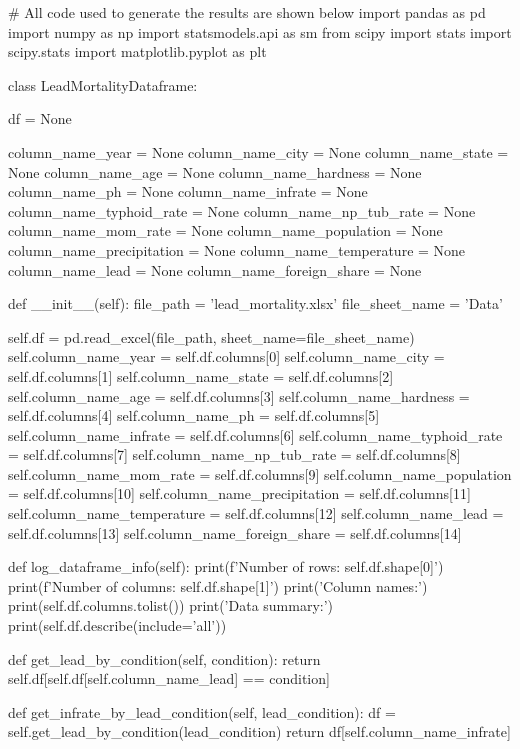 \documentclass{uofa-eng-assignment}
\begin{document}
\begin{python}
# All code used to generate the results are shown below
import pandas as pd
import numpy as np
import statsmodels.api as sm
from scipy import stats
import scipy.stats
import matplotlib.pyplot as plt


class LeadMortalityDataframe:

    df = None

    column_name_year = None
    column_name_city = None
    column_name_state = None
    column_name_age = None
    column_name_hardness = None
    column_name_ph = None
    column_name_infrate = None
    column_name_typhoid_rate = None
    column_name_np_tub_rate = None
    column_name_mom_rate = None
    column_name_population = None
    column_name_precipitation = None
    column_name_temperature = None
    column_name_lead = None
    column_name_foreign_share = None

    def __init__(self):
        file_path = 'lead_mortality.xlsx'
        file_sheet_name = 'Data'

        self.df = pd.read_excel(file_path, sheet_name=file_sheet_name)
        self.column_name_year = self.df.columns[0]
        self.column_name_city = self.df.columns[1]
        self.column_name_state = self.df.columns[2]
        self.column_name_age = self.df.columns[3]
        self.column_name_hardness = self.df.columns[4]
        self.column_name_ph = self.df.columns[5]
        self.column_name_infrate = self.df.columns[6]
        self.column_name_typhoid_rate = self.df.columns[7]
        self.column_name_np_tub_rate = self.df.columns[8]
        self.column_name_mom_rate = self.df.columns[9]
        self.column_name_population = self.df.columns[10]
        self.column_name_precipitation = self.df.columns[11]
        self.column_name_temperature = self.df.columns[12]
        self.column_name_lead = self.df.columns[13]
        self.column_name_foreign_share = self.df.columns[14]

    def log_dataframe_info(self):
        print(f'Number of rows: {self.df.shape[0]}')
        print(f'Number of columns: {self.df.shape[1]}')
        print('Column names:')
        print(self.df.columns.tolist())
        print('Data summary:')
        print(self.df.describe(include='all'))

    def get_lead_by_condition(self, condition):
        return self.df[self.df[self.column_name_lead] == condition]

    def get_infrate_by_lead_condition(self, lead_condition):
        df = self.get_lead_by_condition(lead_condition)
        return df[self.column_name_infrate]



\end{python}
\end{document}
